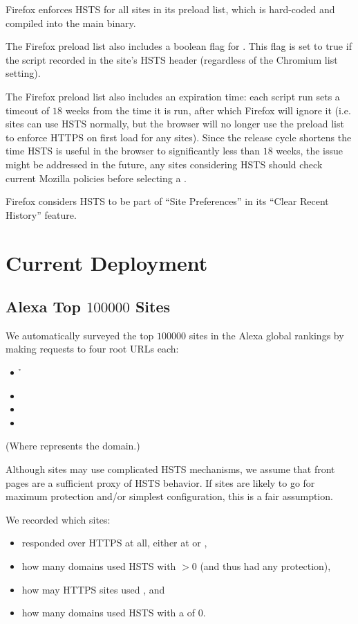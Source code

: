 \documentclass{acm_proc_article-sp}
\begin{document}
Firefox enforces HSTS for all sites in its preload list, which is hard-coded and compiled into the main binary.

The Firefox preload list also includes a boolean flag for \iSD. This flag is set to true if the script recorded {\iSD} in the site's HSTS header (regardless of the Chromium list setting).

The Firefox preload list also includes an expiration time: each script run sets a timeout of $18$ weeks from the time it is run, after which Firefox will ignore it (i.e. sites can use HSTS normally, but the browser will no longer use the preload list to enforce HTTPS on first load for any sites)\cite{firefox-cron-expiration}. Since the release cycle shortens the time HSTS is useful in the browser to significantly less than $18$ weeks, the issue might be addressed in the future, any sites considering HSTS should check current Mozilla policies before selecting a {\ma}.

Firefox considers HSTS to be part of ``Site Preferences'' in its ``Clear Recent History'' feature.

\section{Current Deployment}
\firstsubsectionskip
\subsection{Alexa Top $100000$ Sites}

We automatically surveyed the top $100000$ sites in the Alexa global rankings\cite{alexa} by making  requests to four root URLs each:

\begin{itemize}
\item {\h}
\item {\hw}
\item {\s}
\item {\sw}
\end{itemize}

(Where {\site{\genericsite}} represents the domain.)

Although sites may use complicated HSTS mechanisms, we assume that front pages are a sufficient proxy of HSTS behavior. If sites are likely to go for maximum protection and/or simplest configuration, this is a fair assumption.

We recorded which sites:

\begin{itemize}
\item responded over HTTPS at all, either at {\s} or {\sw},
\item how many domains used HSTS with {\ma}$>0$ (and thus had any protection),
\item how may HTTPS sites used {\iSD}, and
\item how many domains used HSTS with a {\ma} of $0$.
\end{itemize}
\end{document}
